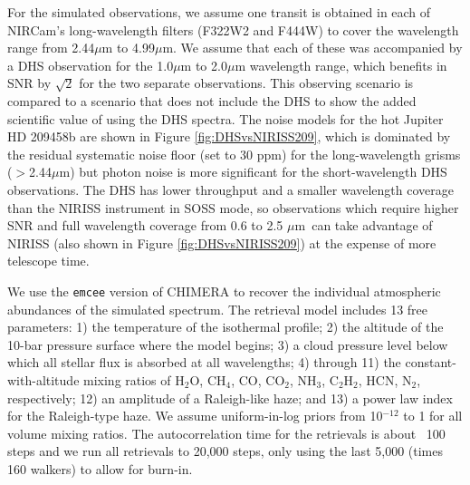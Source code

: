 \documentclass[iop]{emulateapj}
\newcommand{\SOSSrange}{0.6 to 2.5 $\mu$m}
\begin{document}
For the simulated observations, we assume one transit is obtained in each of NIRCam's long-wavelength filters (F322W2 and F444W) to cover the wavelength range from 2.44$\mu$m to 4.99$\mu$m.
We assume that each of these was accompanied by a DHS observation for the 1.0$\mu$m to 2.0$\mu$m wavelength range, which benefits in SNR by $\sqrt{2}$ for the two separate observations.
This observing scenario is compared to a scenario that does not include the DHS to show the added scientific value of using the DHS spectra.
The noise models for the hot Jupiter HD 209458b are shown in Figure \ref{fig:DHSvsNIRISS209}, which is dominated by the residual systematic noise floor (set to 30 ppm) for the long-wavelength grisms ($>$2.44$\mu$m) but photon noise is more significant for the short-wavelength DHS observations.
The DHS has lower throughput and a smaller wavelength coverage than the NIRISS instrument in SOSS mode, so observations which require higher SNR and full wavelength coverage from \SOSSrange\ can take advantage of NIRISS (also shown in Figure \ref{fig:DHSvsNIRISS209}) at the expense of more telescope time.

We use the \texttt{emcee} version of CHIMERA \citep{greene2016jwst_trans} to recover the individual atmospheric abundances of the simulated spectrum. The retrieval model includes 13 free parameters: 1) the temperature of the isothermal profile; 2) the altitude of the 10-bar pressure surface where the model begins; 3) a cloud pressure level below which all stellar flux is absorbed at all wavelengths; 4) through 11) the constant-with-altitude mixing ratios of H$_2$O, CH$_4$, CO, CO$_2$, NH$_3$, C$_2$H$_2$, HCN, N$_2$, respectively; 12) an amplitude of a Raleigh-like haze; and 13) a power law index for the Raleigh-type haze. We assume uniform-in-log priors from 10$^{-12}$ to 1 for all volume mixing ratios. The autocorrelation time for the retrievals is about ~100 steps and we run all retrievals to 20,000 steps, only using the last 5,000 (times 160 walkers) to allow for burn-in.

\end{document}
